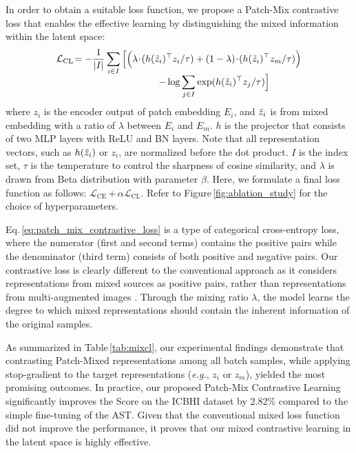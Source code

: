 \documentclass{INTERSPEECH2023}
\begin{document}
In order to obtain a suitable loss function, we propose a Patch-Mix contrastive loss that enables the effective learning by distinguishing the mixed information within the latent space:
\vspace{-2pt}
\begin{align}\label{eq:patch_mix_contrastive_loss}
\mathcal{L}_{\text{CL}} \! = -\frac{1}{|I|} \sum_{i \in I} \Big[ \Big( \lambda \! \cdot \! (h(\Tilde{z}_i)^\top z_i &/ \tau) + (1-\lambda) \! \cdot \! (h(\Tilde{z}_i)^\top z_m  / \tau) \Big) \nonumber \\[-5pt]
-\log &\sum_{j\in I} \exp(h(\Tilde{z}_i)^\top z_j  / \tau) \Big]
\vspace{-2pt}
\end{align}
where $z_i$ is the encoder output of patch embedding $E_i$, and $\Tilde{z}_i$ is from mixed embedding with a ratio of $\lambda$ between $E_i$ and $E_m$. $h$ is the projector that consists of two MLP layers with ReLU and BN layers. Note that all representation vectors, such as $h(\Tilde{z}_i)$ or $z_i$, are normalized before the dot product. $I$ is the index set, $\tau$ is the temperature to control the sharpness of cosine similarity, and $\lambda$ is drawn from Beta distribution with parameter $\beta$. 
Here, we formulate a final loss function as follows: $\mathcal{L}_{\text{CE}}$\,+\,$\alpha \mathcal{L}_{\text{CL}}$.
Refer to Figure\,\ref{fig:ablation_study} for the choice of hyperparameters.


Eq.\,\ref{eq:patch_mix_contrastive_loss} is a type of categorical cross-entropy loss, where the numerator (first and second terms) contains the positive pairs while the denominator (third term) consists of both positive and negative pairs.
Our contrastive loss is clearly different to the conventional approach as it considers representations from mixed sources as positive pairs, rather than representations from multi-augmented images \cite{chen2020simple, he2020momentum}. 
Through the mixing ratio $\lambda$, the model learns the degree to which mixed representations should contain the inherent information of the original samples. 

As summarized in Table\,\ref{tab:mixcl}, our experimental findings demonstrate that contrasting Patch-Mixed representations among all batch samples, while applying stop-gradient to the target representations (\textit{e.g.}, $z_i$ or $z_m$), yielded the most promising outcomes. In practice, our proposed Patch-Mix Contrastive Learning significantly improves the Score on the ICBHI dataset by 2.82\% compared to the simple fine-tuning of the AST. 
Given that the conventional mixed loss function did not improve the performance, it proves that our mixed contrastive learning in the latent space is highly effective.
\end{document}
